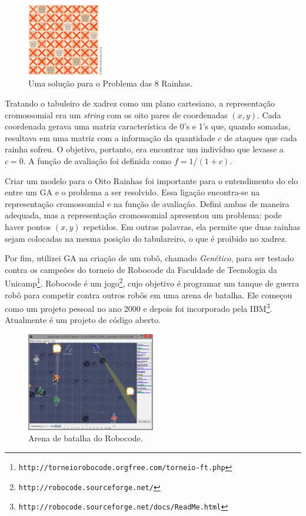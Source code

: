 	\begin{figure}[htbp]
		\centering
			\includegraphics[width=0.30\textwidth]{figs/materiais_metodo/ga/OitoRainhasSolucao.png}
		\caption{Uma solução para o Problema das 8 Rainhas.}
		\label{fig:OitoRainhasSolucao}
	\end{figure}
	
	Tratando o tabuleiro de xadrez como um plano cartesiano, a representação cromossomial era um \emph{string} com os oito pares de coordenadas $(x,y)$. Cada coordenada gerava uma matriz característica de 0's e 1's que, quando somadas, resultava em uma matriz com a informação da quantidade $c$ de ataques que cada rainha sofreu. O objetivo, portanto, era encontrar um indivíduo que levasse a $c = 0$. A função de avaliação foi definida como $f = 1/(1 + c)$.
	
	Criar um modelo para o Oito Rainhas foi importante para o entendimento do elo entre um GA e o problema a ser resolvido. Essa ligação encontra-se na representação cromossomial e na função de avaliação. Defini ambas de maneira adequada, mas a representação cromossomial apresentou um problema: pode haver pontos $(x,y)$ repetidos. Em outras palavras, ela permite que duas rainhas sejam colocadas na mesma posição do tabulareiro, o que é proibido no xadrez. 
	
	Por fim, utilizei GA na criação de um robô, chamado \emph{Genético}, para ser testado contra os campeões do torneio de Robocode da Faculdade de Tecnologia da Unicamp\footnote{\texttt{http://torneiorobocode.orgfree.com/torneio-ft.php}}. Robocode é um jogo\footnote{\texttt{http://robocode.sourceforge.net/}}, cujo objetivo é programar um tanque de guerra robô para competir contra outros robôs em uma arena de batalha. Ele começou como um projeto pessoal no ano 2000 e depois foi incorporado pela IBM\footnote{\texttt{http://robocode.sourceforge.net/docs/ReadMe.html}}. Atualmente é um projeto de código aberto.
	
	\begin{figure}[htbp]
		\centering
			\includegraphics[width=0.50\textwidth]{figs/materiais_metodo/ga/Robocode_Battle_Field.PNG}
		\caption{Arena de batalha do Robocode.}
		\label{fig:Robocode}
	\end{figure}
	
